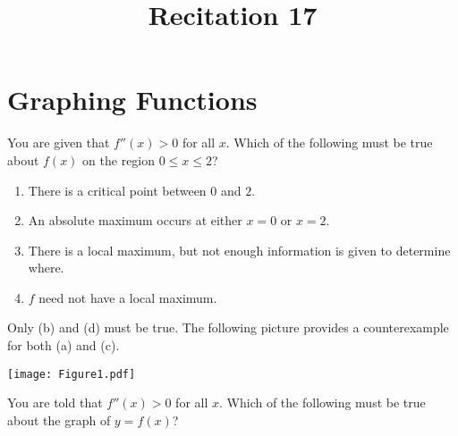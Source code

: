 \documentclass[handout, nooutcomes]{ximera}
\title{Recitation 17}
\renewenvironment{freeResponse}{
\ifhandout\setbox0\vbox\bgroup\else
\begin{trivlist}\item[\hskip \labelsep\bfseries Solution:\hspace{2ex}]
\fi}
{\ifhandout\egroup\else
\end{trivlist}
\fi}
\begin{document}
\begin{abstract}		\end{abstract}
\maketitle

\section{Graphing Functions}

\begin{problem}
  \mbox{}
  \begin{enumerate}
	
  \item[1.]  You are given that $f''(x) > 0$ for all $x$.  Which of
    the following must be true about $f(x)$ on the region
    $0 \leq x \leq 2$?
    \begin{enumerate}
		
    \item There is a critical point between $0$ and $2$.
    \item An absolute maximum occurs at either $x=0$ or $x=2$.
    \item There is a local maximum, but not enough information is
      given to determine where.
    \item $f$ need not have a local maximum.
		
    \end{enumerate}

			\begin{freeResponse}
                          Only (b) and (d) must be true.  The
                          following picture provides a counterexample
                          for both (a) and (c).
			
                          \begin{image}
                            \texttt{[image: Figure1.pdf]}
                          \end{image}
						
			\end{freeResponse}
		
		
		
                      \item[2.]  You are told that $f''(x) > 0$ for
                        all $x$.  Which of the following must be true
                        about the graph of $y=f(x)$?
                        \begin{enumerate}
		

\end{enumerate}
\end{enumerate}
\end{problem}
\end{document}
